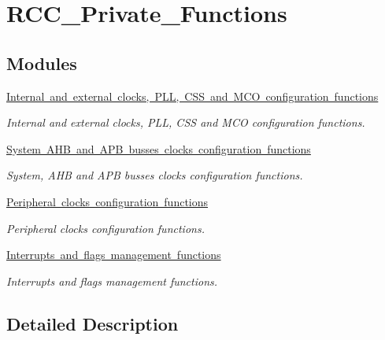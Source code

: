 \hypertarget{group___r_c_c___private___functions}{}\section{R\+C\+C\+\_\+\+Private\+\_\+\+Functions}
\label{group___r_c_c___private___functions}
\subsection*{Modules}
\begin{DoxyCompactItemize}
\item 
\mbox{\hyperlink{group___r_c_c___group1}{Internal and external clocks, P\+L\+L, C\+S\+S and M\+C\+O configuration functions}}
\begin{DoxyCompactList}\small\item\em Internal and external clocks, P\+LL, C\+SS and M\+CO configuration functions. \end{DoxyCompactList}\item 
\mbox{\hyperlink{group___r_c_c___group2}{System A\+H\+B and A\+P\+B busses clocks configuration functions}}
\begin{DoxyCompactList}\small\item\em System, A\+HB and A\+PB busses clocks configuration functions. \end{DoxyCompactList}\item 
\mbox{\hyperlink{group___r_c_c___group3}{Peripheral clocks configuration functions}}
\begin{DoxyCompactList}\small\item\em Peripheral clocks configuration functions. \end{DoxyCompactList}\item 
\mbox{\hyperlink{group___r_c_c___group4}{Interrupts and flags management functions}}
\begin{DoxyCompactList}\small\item\em Interrupts and flags management functions. \end{DoxyCompactList}\end{DoxyCompactItemize}


\subsection{Detailed Description}
